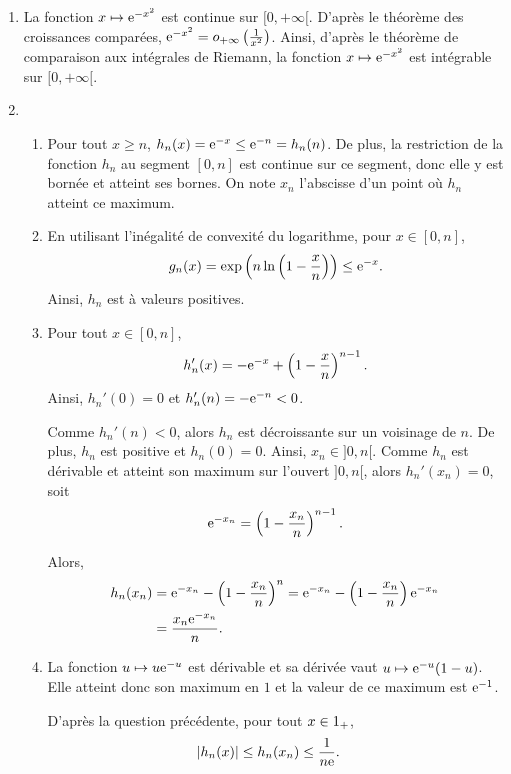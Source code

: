 \begin{preuve}
\begin{enumerate}
\item La fonction $x \mapsto \mathrm{e}^{-x^2}$ est continue sur $[0, +\infty[$. D'après le théorème des croissances comparées, $\mathrm{e}^{-x^2} = o_{+\infty}\left(\frac{1}{x^2}\right)$. Ainsi, d'après le théorème de comparaison aux intégrales de Riemann, la fonction $x \mapsto \mathrm{e}^{-x^2}$ est intégrable sur $[0, +\infty[$.

\item
\begin{enumerate}
\item Pour tout $x \geq n$, $h_n(x) = \mathrm{e}^{-x} \leq \mathrm{e}^{-n} = h_n(n)$. De plus, la restriction de la fonction $h_n$ au segment $[0, n]$ est continue sur ce segment, donc elle y est bornée et atteint ses bornes. On note $x_n$ l'abscisse d'un point où $h_n$ atteint ce maximum.

\item En utilisant l'inégalité de convexité du logarithme, pour $x \in [0, n]$,
\[
g_n(x)
= \exp\left(n \ln\left(1 - \frac{x}{n}\right)\right)
\leq \mathrm{e}^{-x}.
\]
Ainsi, $h_n$ est à valeurs positives.

\item Pour tout $x \in [0, n]$,
\[
h_n'(x) = -\mathrm{e}^{-x} + \left(1 - \frac{x}{n}\right)^{n-1}.
\]
Ainsi, $h_n'(0) = 0$ et $h_n'(n) = - \mathrm{e}^{-n} < 0$.

Comme $h_n'(n) < 0$, alors $h_n$ est décroissante sur un voisinage de $n$. De plus, $h_n$ est positive et $h_n(0) = 0$. Ainsi, $x_n \in ]0, n[$. Comme $h_n$ est dérivable et atteint son maximum sur l'ouvert $]0, n[$, alors $h_n'(x_n) = 0$, soit
\[
\mathrm{e}^{-x_n} = \left(1 - \frac{x_n}{n}\right)^{n-1}.
\]

Alors,
\begin{align*}
h_n(x_n)
&= \mathrm{e}^{-x_n} - \left(1 - \frac{x_n}{n}\right)^n
= \mathrm{e}^{-x_n} - \left(1 - \frac{x_n}{n}\right) \mathrm{e}^{-x_n}\\
&= \frac{x_n \mathrm{e}^{-x_n}}{n}.
\end{align*}

\item La fonction $u \mapsto u \mathrm{e}^{-u}$ est dérivable et sa dérivée vaut $u \mapsto \mathrm{e}^{-u} (1 - u)$. Elle atteint donc son maximum en $1$ et la valeur de ce maximum est $\mathrm{e}^{-1}$.

D'après la question précédente, pour tout $x \in 1_+$,
\begin{align*}
\left| h_n(x) \right|
&\leq h_n(x_n)
\leq \frac{1}{n \mathrm{e}}.
\end{align*}


\end{enumerate}
\end{enumerate}
\end{preuve}
